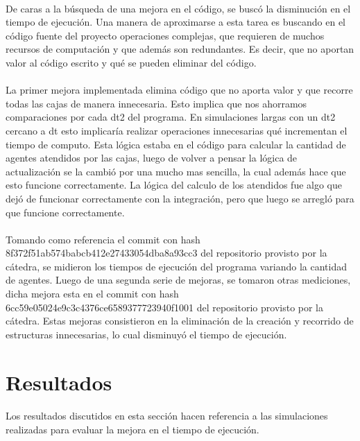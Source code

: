 \documentclass{article}
\begin{document}
\paragraph{}
De caras a la búsqueda de una mejora en el código, se buscó la disminución en el tiempo de ejecución. Una manera de aproximarse a esta tarea es buscando en el código fuente del proyecto operaciones complejas, que requieren de muchos recursos de computación y que además son redundantes. Es decir, que no aportan valor al código escrito y qué se pueden eliminar del código.

\paragraph{}
La primer mejora implementada elimina código que no aporta valor y que recorre todas las cajas de manera innecesaria. Esto implica que nos ahorramos comparaciones por cada dt2 del programa. En simulaciones largas con un dt2 cercano a dt esto implicaría realizar operaciones innecesarias qué incrementan el tiempo de computo. Esta lógica estaba en el código para calcular la cantidad de agentes atendidos por las cajas, luego de volver a pensar la lógica de actualización se la cambió por una mucho mas sencilla, la cual además hace que esto funcione correctamente. La lógica del calculo de los atendidos fue algo que dejó de funcionar correctamente con la integración, pero que luego se arregló para que funcione correctamente.

\paragraph{}
Tomando como referencia el commit con hash 8f372f51ab574babcb412e27433054dba8a93cc3 del repositorio provisto por la cátedra, se midieron los tiempos de ejecución del programa variando la cantidad de agentes. Luego de una segunda serie de mejoras, se tomaron otras mediciones, dicha mejora esta en el commit con hash 6cc59e05024e9c3c4376ce6589377723940f1001 del repositorio provisto por la cátedra. Estas mejoras consistieron en la eliminación de la creación y recorrido de estructuras innecesarias, lo cual disminuyó el tiempo de ejecución.

\section{Resultados}

\paragraph{}
Los resultados discutidos en esta sección hacen referencia a las simulaciones realizadas para evaluar la mejora en el tiempo de ejecución.
\end{document}
